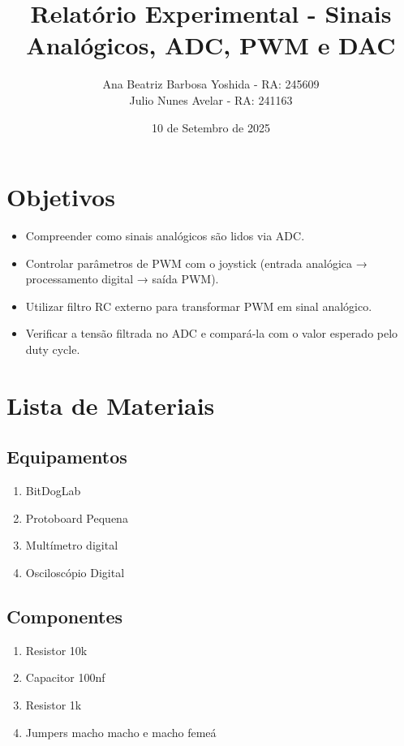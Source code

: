 \documentclass{article}
\title{Relatório Experimental - Sinais Analógicos, ADC, PWM e DAC }
\author{Ana Beatriz Barbosa Yoshida - RA: 245609 \\ Julio Nunes Avelar - RA: 241163}
\date{10 de Setembro de 2025}
\begin{document}
\maketitle

\section{Objetivos}

\begin{itemize}
    \item Compreender como sinais analógicos são lidos via ADC.
    \item Controlar parâmetros de PWM com o joystick (entrada analógica → processamento digital → saída PWM).
    \item Utilizar filtro RC externo para transformar PWM em sinal analógico.
    \item Verificar a tensão filtrada no ADC e compará-la com o valor esperado pelo duty cycle.
\end{itemize}

\section{Lista de Materiais}

\subsection{Equipamentos}

\begin{enumerate}
    \item BitDogLab
    \item Protoboard Pequena
    \item Multímetro digital
    \item Osciloscópio Digital
\end{enumerate}

\subsection{Componentes}

\begin{enumerate}
    \item Resistor 10k
    \item Capacitor 100nf
    \item Resistor 1k
    \item Jumpers macho macho e macho femeá
\end{enumerate}
\end{document}
